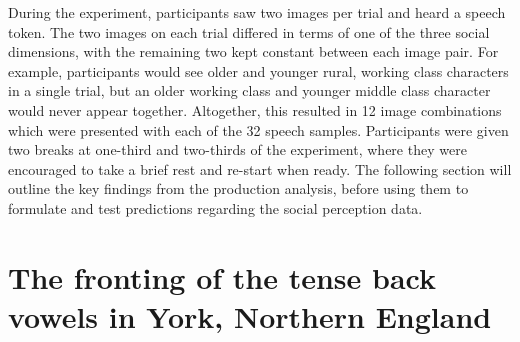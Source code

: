 \documentclass[PWPL]{article}
\begin{document}
During the experiment, participants saw two images per trial and heard a speech token. The two images on each trial differed in terms of one of the three social dimensions, with the remaining two kept constant between each image pair. For example, participants would see older and younger rural, working class characters in a single trial, but an older working class and younger middle class character would never appear together. Altogether, this resulted in 12 image combinations which were presented with each of the 32 speech samples. Participants were given two breaks at one-third and two-thirds of the experiment, where they were encouraged to take a brief rest and re-start when ready. The following section will outline the key findings from the production analysis, before using them to formulate and test predictions regarding the social perception data.

\section{The fronting of the tense back vowels in York, Northern England}
\end{document}
